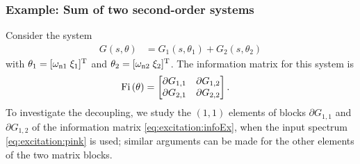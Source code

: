 \subsubsection{Example: Sum of two second-order systems}
\label{sec:excitation:ex:sumOfSecondOrderSipmle}
Consider the system
\begin{align}
G(s,\theta) &= G_1(s,\theta_1) + G_2(s,\theta_2)%
\end{align}
with $\theta_1=[\wn[1]\;\damping[1]]^{\T}$ and $\theta_2=[\wn[2]\;\damping[2]]^{\T}$.
The information matrix for this system is
\begin{align}
\IF &=
       \begin{bmatrix}
         \partial G_{1,1}  & \partial G_{1,2}\\
         \partial G_{2,1}  & \partial G_{2,2}
       \end{bmatrix}.
\label{eq:excitation:infoEx}
\end{align}
To investigate the decoupling, we study the $(1,1)$ elements of blocks $\partial G_{1,1}$ and $\partial G_{1,2}$ of the information matrix \eqref{eq:excitation:infoEx}, when the input spectrum \eqref{eq:excitation:pink} is used; similar arguments can be made for the other elements of the two matrix blocks.

